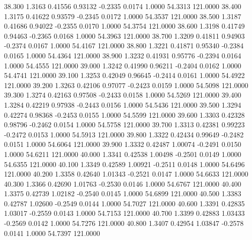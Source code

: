   38.300   1.3163   0.41556   0.93132  -0.2335   0.0174   1.0000  54.3313 121.0000
  38.400   1.3175   0.41622   0.93579  -0.2345   0.0172   1.0000  54.3537 121.0000
  38.500   1.3187   0.41686   0.94022  -0.2355   0.0170   1.0000  54.3754 121.0000
  38.600   1.3198   0.41749   0.94463  -0.2365   0.0168   1.0000  54.3963 121.0000
  38.700   1.3209   0.41811   0.94903  -0.2374   0.0167   1.0000  54.4167 121.0000
  38.800   1.3221   0.41871   0.95340  -0.2384   0.0165   1.0000  54.4364 121.0000
  38.900   1.3232   0.41931   0.95776  -0.2394   0.0164   1.0000  54.4555 121.0000
  39.000   1.3242   0.41990   0.96211  -0.2404   0.0162   1.0000  54.4741 121.0000
  39.100   1.3253   0.42049   0.96645  -0.2414   0.0161   1.0000  54.4922 121.0000
  39.200   1.3263   0.42106   0.97077  -0.2423   0.0159   1.0000  54.5098 121.0000
  39.300   1.3274   0.42163   0.97508  -0.2433   0.0158   1.0000  54.5269 121.0000
  39.400   1.3284   0.42219   0.97938  -0.2443   0.0156   1.0000  54.5436 121.0000
  39.500   1.3294   0.42274   0.98368  -0.2453   0.0155   1.0000  54.5599 121.0000
  39.600   1.3303   0.42328   0.98796  -0.2462   0.0154   1.0000  54.5758 121.0000
  39.700   1.3313   0.42381   0.99223  -0.2472   0.0153   1.0000  54.5913 121.0000
  39.800   1.3322   0.42434   0.99649  -0.2482   0.0151   1.0000  54.6064 121.0000
  39.900   1.3332   0.42487   1.00074  -0.2491   0.0150   1.0000  54.6211 121.0000
  40.000   1.3341   0.42538   1.00498  -0.2501   0.0149   1.0000  54.6355 121.0000
  40.100   1.3349   0.42589   1.00921  -0.2511   0.0148   1.0000  54.6496 121.0000
  40.200   1.3358   0.42640   1.01343  -0.2521   0.0147   1.0000  54.6633 121.0000
  40.300   1.3366   0.42690   1.01763  -0.2530   0.0146   1.0000  54.6767 121.0000
  40.400   1.3375   0.42739   1.02182  -0.2540   0.0145   1.0000  54.6899 121.0000
  40.500   1.3383   0.42787   1.02600  -0.2549   0.0144   1.0000  54.7027 121.0000
  40.600   1.3391   0.42835   1.03017  -0.2559   0.0143   1.0000  54.7153 121.0000
  40.700   1.3399   0.42883   1.03433  -0.2569   0.0142   1.0000  54.7276 121.0000
  40.800   1.3407   0.42954   1.03847  -0.2578   0.0141   1.0000  54.7397 121.0000
